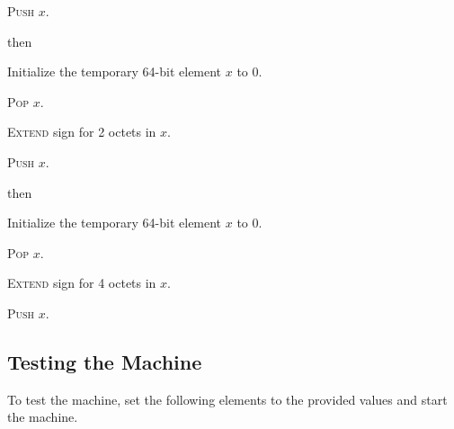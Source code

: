 \documentclass[a4paper,12pt]{article}
\newcommand{\num}[1]{\texttt{#1}}
\newcommand{\hex}[1]{\num{#1}_{\textup{\tiny 16}}}
\newcommand{\proc}[1]{\textsc{#1}}
\newcommand{\op}[1]{$#1$}
\newcommand{\SIGXS}     [1]{\op{\hex{0D}}}
\newcommand{\SIGXI}     [1]{\op{\hex{0E}}}
\begin{document}
\begin{stepnumbers}[start=3]
\begin{description}
\begin{stepnumbers}
    \item \proc{Push} $x$.
    \end{stepnumbers}
  \item[\SIGXS{}] then
    \begin{stepnumbers}
    \item Initialize the temporary 64-bit element $x$ to 0.
    \item \proc{Pop} $x$.
    \item \proc{Extend} sign for 2 octets in $x$.
    \item \proc{Push} $x$.
    \end{stepnumbers}
  \item[\SIGXI{}] then
    \begin{stepnumbers}
    \item Initialize the temporary 64-bit element $x$ to 0.
    \item \proc{Pop} $x$.
    \item \proc{Extend} sign for 4 octets in $x$.
    \item \proc{Push} $x$.
    \end{stepnumbers}
  \end{description}
\end{stepnumbers}

\subsection{Testing the Machine}

To test the machine, set the following elements to the provided values and start the machine.
\end{document}
